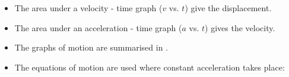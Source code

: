 \begin{itemize}[noitemsep]
\label{m38796*uid168}\item The area under a velocity - time graph (\begin{math}v\end{math} vs. \begin{math}t\end{math}) give the displacement.
\label{m38796*uid169}\item The area under an acceleration - time graph (\begin{math}a\end{math} vs. \begin{math}t\end{math}) gives the velocity.
\label{m38796*uid170}\item The graphs of motion are summarised in .
\label{m38796*uid171}\item The equations of motion are used where constant acceleration takes place:
\label{m38796*id81101}\nopagebreak\noindent{}
    \end{itemize}
